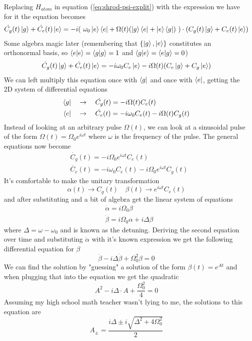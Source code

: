 Replacing $H_{atom}$ in equation  (\ref{eq:shrod-psi-explit}) with the expression we have for it the equation becomes
\[
    \dot{C_g} (t) \ket{g} + \dot{C_e} (t) \ket{e} = -i  (\ \omega_0\ket{e}\bra{e} + \Omega (t) (\ket{g}\bra{e} + \ket{e}\bra{g})\ )\cdot  (C_g (t) \ket{g} + C_e (t) \ket{e})
\]
Some algebra magic later (remembering that $\{\ket{g},\ket{e}\}$ constitutes an orthonormal basis, so $\braket{e}{e} = \braket{g}{g} = 1$ and $\braket{g}{e} = \braket{e}{g} = 0$)
\[
    \dot{C_g} (t) \ket{g} + \dot{C_e} (t) \ket{e} = -i \omega_0 C_e \ket{e} - i\Omega (t) (C_e\ket{g} + C_g \ket{e})
\]
We can left multiply this equation once with $\bra{g}$ and once with $\bra{e}$, getting the 2D system of differential equations
\begin{align*}
    \bra{g} \quad &\rightarrow \quad \dot{C_g} (t) = -i \Omega (t)C_e (t) \\
    \bra{e} \quad &\rightarrow \quad \dot{C_e} (t) = -i \omega_0 C_e (t) - i\Omega (t) C_g (t)
\end{align*} 
Instead of looking at an arbitrary pulse $\Omega  (t)$, we can look at a sinusoidal pulse of the form $\Omega  (t) = \Omega_0 e^{i\omega t}$ where $\omega$ is the frequency of the pulse. The general equations now become
\begin{align*}
    &\dot{C_g} (t) = -i \Omega_0 e^{i\omega t}C_e (t) \\
    &\dot{C_e} (t) = -i \omega_0 C_e (t) - i \Omega_0 e^{i\omega t} C_g (t)
\end{align*}
It's comfortable to make the unitary transformation
\[
    \alpha (t) \rightarrow C_g (t) \quad \beta (t) \rightarrow e^{i \omega t} C_e (t)
\]
and after substituting and a bit of algebra get the linear system of equations
\begin{align*}
    &\dot{\alpha} = i \Omega_0 \beta \\
    &\dot{\beta} = i \Omega_0 \alpha + i \Delta \beta
\end{align*}
where $\Delta = \omega - \omega_0$ and is known as the detuning. Deriving the second equation over time and substituting $\dot{\alpha}$ with it's known expression we get the following differential equation for $\beta$
\[
    \ddot{\beta} - i \Delta \dot{\beta} + \Omega_0^2\beta = 0
\]
We can find the solution by "guessing" a solution of the form $\beta (t) = e^{A t}$ and when plugging that into the equation we get the quadratic
\[
    A^2 - i \Delta \cdot A + \frac{\Omega_0^2}{4} = 0
\]
Assuming my high school math teacher wasn't lying to me, the solutions to this equation are
\[
    A_{\pm} = \frac{i \Delta \pm i\sqrt{\Delta^2 + 4\Omega_0^2}}{2}
\]
